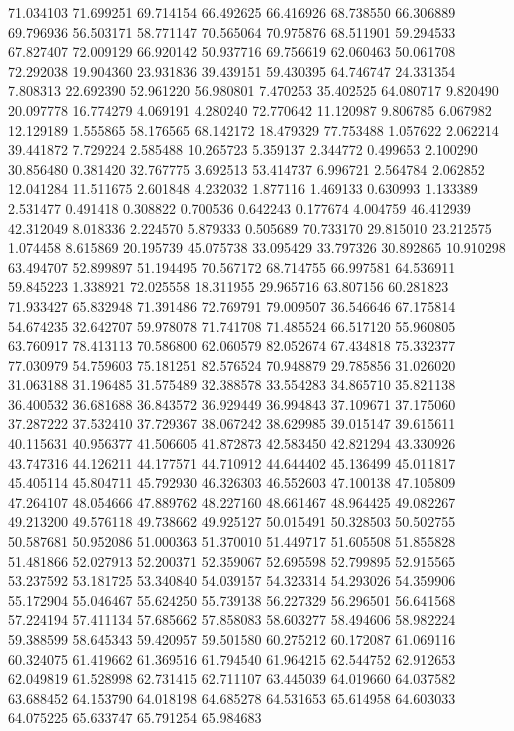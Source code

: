 71.034103
71.699251
69.714154
66.492625
66.416926
68.738550
66.306889
69.796936
56.503171
58.771147
70.565064
70.975876
68.511901
59.294533
67.827407
72.009129
66.920142
50.937716
69.756619
62.060463
50.061708
72.292038
19.904360
23.931836
39.439151
59.430395
64.746747
24.331354
7.808313
22.692390
52.961220
56.980801
7.470253
35.402525
64.080717
9.820490
20.097778
16.774279
4.069191
4.280240
72.770642
11.120987
9.806785
6.067982
12.129189
1.555865
58.176565
68.142172
18.479329
77.753488
1.057622
2.062214
39.441872
7.729224
2.585488
10.265723
5.359137
2.344772
0.499653
2.100290
30.856480
0.381420
32.767775
3.692513
53.414737
6.996721
2.564784
2.062852
12.041284
11.511675
2.601848
4.232032
1.877116
1.469133
0.630993
1.133389
2.531477
0.491418
0.308822
0.700536
0.642243
0.177674
4.004759
46.412939
42.312049
8.018336
2.224570
5.879333
0.505689
70.733170
29.815010
23.212575
1.074458
8.615869
20.195739
45.075738
33.095429
33.797326
30.892865
10.910298
63.494707
52.899897
51.194495
70.567172
68.714755
66.997581
64.536911
59.845223
1.338921
72.025558
18.311955
29.965716
63.807156
60.281823
71.933427
65.832948
71.391486
72.769791
79.009507
36.546646
67.175814
54.674235
32.642707
59.978078
71.741708
71.485524
66.517120
55.960805
63.760917
78.413113
70.586800
62.060579
82.052674
67.434818
75.332377
77.030979
54.759603
75.181251
82.576524
70.948879
29.785856
31.026020
31.063188
31.196485
31.575489
32.388578
33.554283
34.865710
35.821138
36.400532
36.681688
36.843572
36.929449
36.994843
37.109671
37.175060
37.287222
37.532410
37.729367
38.067242
38.629985
39.015147
39.615611
40.115631
40.956377
41.506605
41.872873
42.583450
42.821294
43.330926
43.747316
44.126211
44.177571
44.710912
44.644402
45.136499
45.011817
45.405114
45.804711
45.792930
46.326303
46.552603
47.100138
47.105809
47.264107
48.054666
47.889762
48.227160
48.661467
48.964425
49.082267
49.213200
49.576118
49.738662
49.925127
50.015491
50.328503
50.502755
50.587681
50.952086
51.000363
51.370010
51.449717
51.605508
51.855828
51.481866
52.027913
52.200371
52.359067
52.695598
52.799895
52.915565
53.237592
53.181725
53.340840
54.039157
54.323314
54.293026
54.359906
55.172904
55.046467
55.624250
55.739138
56.227329
56.296501
56.641568
57.224194
57.411134
57.685662
57.858083
58.603277
58.494606
58.982224
59.388599
58.645343
59.420957
59.501580
60.275212
60.172087
61.069116
60.324075
61.419662
61.369516
61.794540
61.964215
62.544752
62.912653
62.049819
61.528998
62.731415
62.711107
63.445039
64.019660
64.037582
63.688452
64.153790
64.018198
64.685278
64.531653
65.614958
64.603033
64.075225
65.633747
65.791254
65.984683
